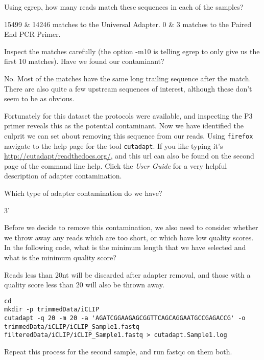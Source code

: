 \begin{questions}
Using egrep, how many reads match these sequences in each of the samples?\\
\begin{answer}
15499 \& 14246 matches to the Universal Adapter.
0 \& 3 matches to the Paired End PCR Primer.
\end{answer}

Inspect the matches carefully (the option -m10 is telling egrep to only give us the first 10 matches).
Have we found our contaminant?
\begin{answer}
No. 
Most of the matches have the same long trailing sequence after the match.
There are also quite a few upstream sequences of interest, although these don't seem to be as obvious.
\end{answer}
\end{questions}

Fortunately for this dataset the protocols were available, and inspecting the P3 primer reveals this as the potential contaminant.
Now we have identified the culprit we can set about removing this sequence from our reads.
Using \texttt{firefox} navigate to the help page for the tool \texttt{cutadapt}.
If you like typing it's \url{http://cutadapt/readthedocs.org/}, and this url can also be found on the second page of the command line help.
Click the \textit{User Guide} for a very helpful description of adapter contamination.

\begin{questions}
Which type of adapter contamination do we have? \\
\begin{answer}
3'
\end{answer}

Before we decide to remove this contamination, we also need to consider whether we throw away any reads which are too short, or which have low quality scores.
In the following code, what is the minimum length that we have selected and what is the minimum quality score?\\
\begin{answer}
Reads less than 20nt will be discarded after adapter removal, and those with a quality score less than 20 will also be thrown away.
\end{answer}
\end{questions}

\begin{steps}
\begin{lstlisting}
cd
mkdir -p trimmedData/iCLIP
cutadapt -q 20 -m 20 -a 'AGATCGGAAGAGCGGTTCAGCAGGAATGCCGAGACCG' -o trimmedData/iCLIP/iCLIP_Sample1.fastq filteredData/iCLIP/iCLIP_Sample1.fastq > cutadapt.Sample1.log
\end{lstlisting}
Repeat this process for the second sample, and run fastqc on them both.
\end{steps}

